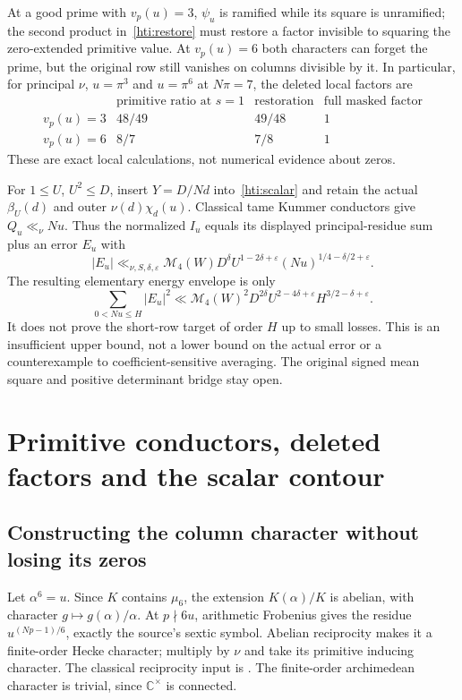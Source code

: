 \documentclass[11pt,oneside,openany]{book}
\theoremstyle{definition}\newtheorem{definition}[theorem]{Definition}
\theoremstyle{remark}\newtheorem{remark}[theorem]{Remark}
\begin{document}
At a good prime with $v_p(u)=3$, $\psi_u$ is ramified while its square
is unramified; the second product in~\eqref{hti:restore} must restore a
factor invisible to squaring the zero-extended primitive value.
At $v_p(u)=6$ both characters can forget the prime, but the original row
still vanishes on columns divisible by it. In particular, for principal
$\nu$, $u=\pi^3$ and $u=\pi^6$ at $N\pi=7$, the deleted local factors are
\[
\begin{array}{c|ccc}
 &\text{primitive ratio at }s=1&\text{restoration}&\text{full masked factor}\\\hline
v_p(u)=3&48/49&49/48&1\\
v_p(u)=6&8/7&7/8&1
\end{array}
\]
These are exact local calculations, not numerical evidence about zeros.

For $1\le U$, $U^2\le D$, insert $Y=D/Nd$ into~\eqref{hti:scalar}
and retain the actual $\beta_U(d)$ and outer $\nu(d)\chi_d(u)$.
Classical tame Kummer conductors give $Q_u\ll_\nu Nu$. Thus the normalized
$I_u$ equals its displayed principal-residue sum plus an error $E_u$ with
\begin{equation}\label{hti:outer}
 |E_u|\ll_{\nu,S,\delta,\varepsilon}\mathcal M_4(W)
 D^\delta U^{1-2\delta+\varepsilon}
 (Nu)^{1/4-\delta/2+\varepsilon}.
\end{equation}
The resulting elementary energy envelope is only
\begin{equation}\label{hti:energy}
 \sum_{0<Nu\le H}|E_u|^2
 \ll\mathcal M_4(W)^2D^{2\delta}U^{2-4\delta+\varepsilon}
 H^{3/2-\delta+\varepsilon}.
\end{equation}
It does not prove the short-row target of order $H$ up to small losses.
This is an insufficient upper bound, not a lower bound on the actual
error or a counterexample to coefficient-sensitive averaging. The
original signed mean square and positive determinant bridge stay open.

\section{Primitive conductors, deleted factors and the scalar contour}
\label{hti:details}
\subsection{Constructing the column character without losing its zeros}
Let $\alpha^6=u$. Since $K$ contains $\mu_6$, the extension $K(\alpha)/K$
is abelian, with character $g\mapsto g(\alpha)/\alpha$. At $p\nmid6u$,
arithmetic Frobenius gives the residue $u^{(Np-1)/6}$, exactly the
source's sextic symbol. Abelian reciprocity makes it a finite-order Hecke
character; multiply by $\nu$ and take its primitive inducing character.
The classical reciprocity input is \cite[Theorem~0.8 and Chapter~I,\S1]{MilneCFTTypeI}.
The finite-order archimedean character is trivial, since $\mathbb C^\times$
is connected.
\end{document}
